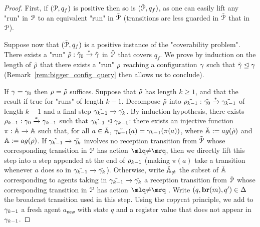 \begin{proof}
	First, if $(\mathcal{P}, q_f)$ is positive then so is $(\tilde{\mathcal{P}}, q_f)$, as one can easily lift any "run" in $\mathcal{P}$ to an equivalent "run" in $\tilde{\mathcal{P}}$ (transitions are less guarded  in $\tilde{\mathcal{P}}$ that in $\mathcal{P}$). 
	
	Suppose now that $(\tilde{\mathcal{P}}, q_f)$ is a positive instance of the "coverability problem". There exists a "run" $\tilde{\rho}: \tilde{\gamma}_0 \xrightarrow{*} \tilde{\gamma}$ in $\tilde{\mathcal{P}}$ that covers $q_f$. We prove by induction on the length of $\tilde{\rho}$ that there exists a "run" $\rho$ reaching a configuration $\gamma$ such that $\tilde{\gamma} \trianglelefteq \gamma$ (Remark~\ref{rem:bigger_config_query} then allows us to conclude). 
	
	If $\gamma = \gamma_0$ then $\rho = \tilde{\rho}$ suffices. Suppose that $\tilde{\rho}$ has length $k \geq 1$, and that the result if true for "runs" of length $k-1$. Decompose $\tilde{\rho}$ into $\tilde{\rho_{k-1}}: \tilde{\gamma_0} \xrightarrow{*} \tilde{\gamma_{k-1}}$ of length $k-1$ and a final step $\tilde{\gamma_{k-1}} \xrightarrow{} \tilde{\gamma_k}$. 
	By induction hypothesis, there exists $\rho_{k-1}: \gamma_0 \xrightarrow{*} \gamma_{k-1}$ such that $\tilde{\gamma_{k-1}} \trianglelefteq \gamma_{k-1}$: there exists an injective function $\pi : \tilde{\mathbb{A}} \rightarrow \mathbb{A}$
	such that, for all $a \in \tilde{\mathbb{A}}$, $\tilde{\gamma_{k-1}}(a) = \gamma_{k-1}(\pi(a))$, where $\tilde{\agents} := \agentsof{\tilde{\run}}$ and $\agents := \agentsof{\run}$. If $\tilde{\gamma_{k-1}} \xrightarrow{} \tilde{\gamma_k}$ involves no reception transition from $\tilde{\mathcal{P}}$ whose corresponding transition in $\mathcal{P}$ has action $\quotemarks{\diseqtestact}$, then we directly lift this step into a step appended at the end of $\rho_{k-1}$ (making $\pi(a)$ take a transition whenever $a$ does so in $\tilde{\gamma_{k-1}} \xrightarrow{} \tilde{\gamma_k}$). Otherwise, write $\tilde{\mathbb{A}}_{{\ne}}$ the subset of $\tilde{\mathbb{A}}$ corresponding to agents taking in $\tilde{\gamma_{k-1}} \xrightarrow{} \tilde{\gamma_k}$ a reception transition from $\tilde{\mathcal{P}}$ whose corresponding transition in $\mathcal{P}$ has action $\quotemarks{\diseqtestact}$ . Write $(q, \textbf{br}(m), q') \in \Delta$ the broadcast transition used in this step.  Using the copycat principle, we add to $\gamma_{k-1}$ a fresh agent $a_{\mathsf{new}}$ with state $q$ and a register value that does not appear in $\gamma_{k-1}$. 

\end{proof}
